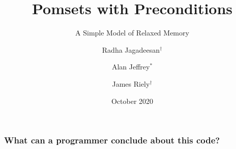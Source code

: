 \documentclass[t]{beamer}
\title{Pomsets with Preconditions}
\subtitle{A Simple Model of Relaxed Memory}
\author{Radha Jagadeesan$^\dagger$ \and Alan Jeffrey$^*$ \and James Riely$^\dagger$}
\date{October 2020}
\institute{$^\dagger$DePaul University \and $^*$Mozilla Research and the Servo Project}
\begin{document}
\begin{frame}
  \maketitle
\end{frame}

\begin{frame}
  \frametitle{What can a programmer conclude about this code?}
\end{frame}
\end{document}
